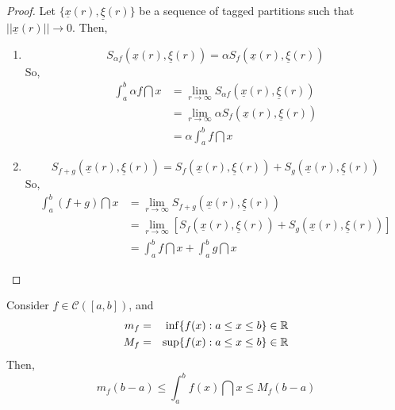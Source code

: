 \begin{proof}
     Let $\{\underline{x}(r), \underline{\xi}(r)\}$ be a sequence of tagged partitions such that $||\underline{x}(r)|| \to 0$. Then,
    \begin{enumerate}
        \item
            \begin{equation*}
                S_{\alpha f} (\underline{x}(r), \underline{\xi}(r))  = \alpha S_f(\underline{x}(r), \underline{\xi}(r))
            \end{equation*}
            So,
            \begin{align*}
                \int_a^b \alpha f \dint x &= \lim \limits_{r \to \infty} S_{\alpha f}(\underline{x}(r), \underline{\xi}(r)) \\
                &= \lim \limits_{r \to \infty} \alpha S_f(\underline{x}(r), \underline{\xi}(r)) \\
                &= \alpha \int_a^b f \dint x
            \end{align*}
        \item 
            \begin{equation*}
                S_{f + g}(\underline{x}(r), \underline{\xi}(r)) = S_f(\underline{x}(r), \underline{\xi}(r)) + S_g(\underline{x}(r), \underline{\xi}(r))
            \end{equation*}
            So,
            \begin{align*}
                \int_a^b (f+g) \dint x &= \lim \limits_{r \to \infty}S_{f + g}(\underline{x}(r), \underline{\xi}(r)) \\
                &= \lim \limits_{r \to \infty}[ S_f(\underline{x}(r), \underline{\xi}(r)) + S_g(\underline{x}(r), \underline{\xi}(r))] \\
                &= \int_a^b f \dint x + \int_a^b g \dint x
            \end{align*}
    \end{enumerate}
\end{proof}

\begin{theorem}
    Consider $f \in \mathcal{C}([a,b])$, and
    \begin{eqnarray*}
        m_f &=& \inf \{ f(x) : a \leq x \leq b \} \in \mathbb{R} \\
        M_f &=& \sup \{ f(x) : a \leq x \leq b \} \in \mathbb{R} \\
    \end{eqnarray*}
    Then,
    \begin{equation*}
        m_f(b-a) \leq \int_a^b f(x)\dint x \leq M_f(b-a)
    \end{equation*}
\end{theorem}

